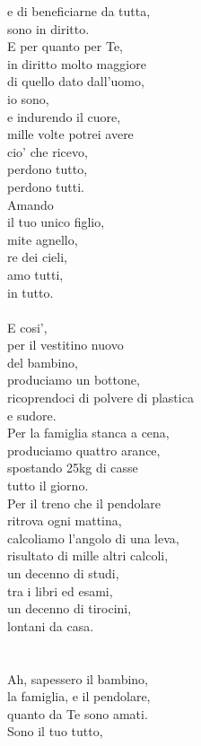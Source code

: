 \begin{haiku}
e di beneficiarne da tutta,\\
sono in diritto.\\
E per quanto per Te,\\
in diritto molto maggiore\\
di quello dato dall'uomo,\\
io sono,\\
e indurendo il cuore,\\
mille volte potrei avere\\
cio' che ricevo,\\
perdono tutto,\\
perdono tutti.\\
Amando \\
il tuo unico figlio,\\
mite agnello,\\
re dei cieli,\\
amo tutti,\\
in tutto.\\
\leavevmode\\
E cosi',\\
per il vestitino nuovo\\
del bambino,\\
produciamo un bottone,\\
ricoprendoci di polvere di plastica\\
e sudore.\\
Per la famiglia stanca a cena,\\
produciamo quattro arance,\\
spostando 25kg di casse\\
tutto il giorno.\\
Per il treno che il pendolare \\
ritrova ogni mattina,\\
calcoliamo l'angolo di una leva,\\
risultato di mille altri calcoli,\\
un decenno di studi, \\
tra i libri ed esami,\\
un decenno di tirocini,\\
lontani da casa.\\
\leavevmode\\
\leavevmode\\
Ah, sapessero il bambino,\\
la famiglia, e il pendolare,\\
quanto da Te sono amati.\\
Sono il tuo tutto,\\

\end{haiku}
